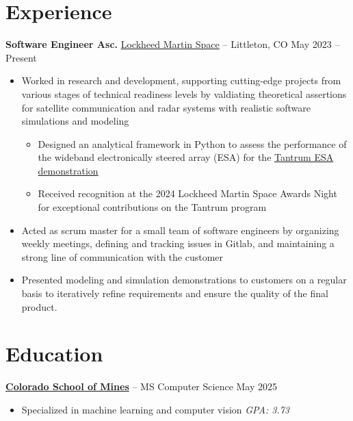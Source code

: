 \documentclass[11pt]{article}       %
\begin{document}
\section*{Experience}
\textbf{Software Engineer Asc.} \href{https://www.lockheedmartin.com/en-us/capabilities/space.html}{Lockheed Martin Space}
-- Littleton, CO \hfill May 2023 -- Present \\
\vspace{-9pt}
\begin{itemize}
      \item Worked in research and development, supporting cutting-edge projects
            from various stages of technical readiness levels by valdiating
            theoretical assertions for satellite communication and radar systems
            with realistic software simulations and modeling
            \vspace{-7.5pt}
            \begin{itemize}
                  \item Designed an analytical framework in Python to assess the
                        performance of the wideband electronically steered array (ESA)
                        for the \href{https://news.lockheedmartin.com/ESA_payload_demonstrator}{Tantrum ESA demonstration}
                  \item Received recognition at the 2024 Lockheed Martin Space Awards Night
                        for exceptional contributions on the Tantrum program
            \end{itemize}
            \vspace{-6.5pt}
      \item Acted as scrum master for a small team of software engineers by
            organizing weekly meetings, defining and tracking issues in Gitlab,
            and maintaining a strong line of communication with the customer
      \item Presented modeling and simulation demonstrations to customers on a
            regular basis to iteratively refine requirements and ensure the
            quality of the final product.
\end{itemize}

\vspace{-18.5pt}

\section*{Education}
\textbf{\href{https://cs.mines.edu}{Colorado School of Mines}} -- MS Computer Science \hfill May 2025 \\
\vspace{-11.5pt}
\begin{itemize}
      \itemsep -0.5em
      \item Specialized in machine learning and computer vision \hfill \textit{GPA: 3.73}
\end{itemize}
\end{document}
